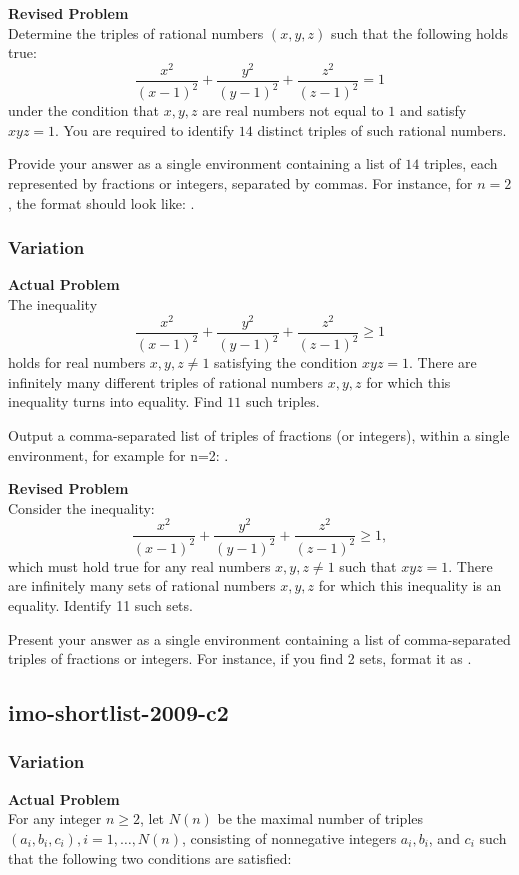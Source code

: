 \textbf{Revised Problem}\\
Determine the triples of rational numbers $(x, y, z)$ such that the following holds true:
$$
\frac{x^2}{(x-1)^2} + \frac{y^2}{(y-1)^2} + \frac{z^2}{(z-1)^2} = 1
$$
under the condition that $x, y, z$ are real numbers not equal to $1$ and satisfy $xyz = 1$. You are required to identify $14$ distinct triples of such rational numbers.

Provide your answer as a single \boxed environment containing a list of $14$ triples, each represented by fractions or integers, separated by commas. For instance, for $n=2$, the format should look like: .

\subsubsection{Variation}
\textbf{Actual Problem}\\
The inequality
$$
\frac{x^2}{(x-1)^2} + \frac{y^2}{(y-1)^2} + \frac{z^2}{(z-1)^2} \geq 1
$$
holds for real numbers $x, y, z \neq 1$ satisfying the condition $xyz = 1$.
There are infinitely many different triples of rational numbers $x, y, z$ for which this inequality turns into equality.
Find $11$ such triples.


Output a comma-separated list of triples of fractions (or integers), within a single \boxed environment, for example for n=2: .

\textbf{Revised Problem}\\
Consider the inequality:
$$
\frac{x^2}{(x-1)^2} + \frac{y^2}{(y-1)^2} + \frac{z^2}{(z-1)^2} \geq 1,
$$
which must hold true for any real numbers \(x, y, z \neq 1\) such that \(xyz = 1\).
There are infinitely many sets of rational numbers \(x, y, z\) for which this inequality is an equality. Identify 11 such sets.

Present your answer as a single \boxed environment containing a list of comma-separated triples of fractions or integers. For instance, if you find 2 sets, format it as .

\subsection{imo-shortlist-2009-c2}
\subsubsection{Variation}
\textbf{Actual Problem}\\
For any integer $n \geq 2$, let $N(n)$ be the maximal number of triples $(a_i, b_i, c_i), i=1,\ldots,N(n)$, consisting of nonnegative integers $a_i, b_i$, and $c_i$ such that the following two conditions are satisfied:

